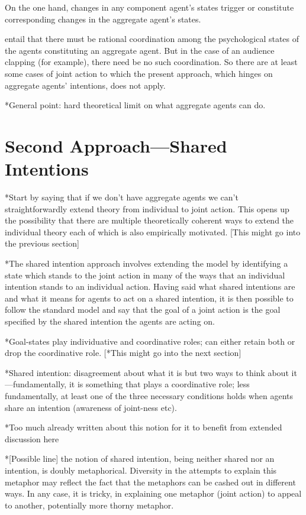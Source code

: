 \documentclass[12pt,a4paper]{extarticle}
\begin{document}
On the one hand, changes in any component agent's states trigger or constitute corresponding changes in the aggregate agent's states.  

entail that there must be rational coordination among the psychological states of the agents constituting an aggregate agent.  But in the case of an audience clapping (for example), there need be no such coordination.  So there are at least some cases of joint action to which the present approach, which hinges on aggregate agents' intentions, does not apply.

*General point: hard theoretical limit on what aggregate agents can do.

\section{Second Approach---Shared Intentions}
*Start by saying that if we don't have aggregate agents we can't straightforwardly extend theory from individual to joint action.  This opens up the possibility that there are multiple theoretically coherent ways to extend the individual theory each of which is also empirically motivated. [This might go into the previous section]

*The shared intention approach involves extending the model by identifying a state which stands to the joint action in many of the ways that an individual intention stands to an individual action.  Having said what shared intentions are and what it means for agents to act on a shared intention, it is then possible to follow the standard model and say that the goal of a joint action is the goal specified by the shared intention the agents are acting on.

*Goal-states play individuative and coordinative roles; can either retain both or drop the coordinative role. [*This might go into the next section]

*Shared intention: disagreement about what it is but two ways to think about it---fundamentally, it is something that plays a coordinative role; less fundamentally, at least one of the three necessary conditions holds when agents share an intention (awareness of joint-ness etc). 

*Too much already written about this notion for it to benefit from  extended discussion here

*[Possible line] the notion of shared intention, being neither shared nor an intention, is doubly metaphorical.  Diversity in the attempts to explain this metaphor may reflect the fact that the metaphors can be cashed out in different ways.  In any case, it is tricky, in explaining one metaphor (joint action) to appeal to another, potentially more thorny metaphor.
\end{document}
